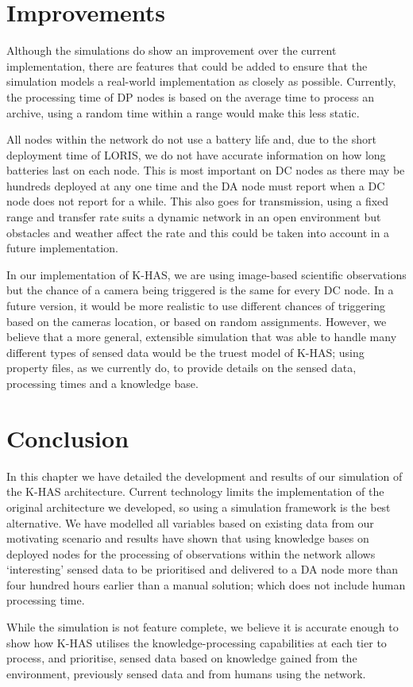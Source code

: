 	
\section{Improvements}
Although the simulations do show an improvement over the current implementation, there are features that could be added to ensure that the simulation models a real-world implementation as closely as possible. Currently, the processing time of DP nodes is based on the average time to process an archive, using a random time within a range would make this less static. 

All nodes within the network do not use a battery life and, due to the short deployment time of LORIS, we do not have accurate information on how long batteries last on each node. This is most important on DC nodes as there may be hundreds deployed at any one time and the DA node must report when a DC node does not report for a while. This also goes for transmission, using a fixed range and transfer rate suits a dynamic network in an open environment but obstacles and weather affect the rate and this could be taken into account in a future implementation.

In our implementation of K-HAS, we are using image-based scientific observations but the chance of a camera being triggered is the same for every DC node. In a future version, it would be more realistic to use different chances of triggering based on the cameras location, or based on random assignments. However, we believe that a more general, extensible simulation that was able to handle many different types of sensed data would be the truest model of K-HAS; using property files, as we currently do, to provide details on the sensed data, processing times and a knowledge base.

\section{Conclusion}
In this chapter we have detailed the development and results of our simulation of the K-HAS architecture. Current technology limits the implementation of the original architecture we developed, so using a simulation framework is the best alternative. We have modelled all variables based on existing data from our motivating scenario and results have shown that using knowledge bases on deployed nodes for the processing of observations within the network allows `interesting' sensed data to be prioritised and delivered to a DA node more than four hundred hours earlier than a manual solution; which does not include human processing time.

While the simulation is not feature complete, we believe it is accurate enough to show how K-HAS utilises the knowledge-processing capabilities at each tier to process, and prioritise, sensed data based on knowledge gained from the environment, previously sensed data and from humans using the network.

